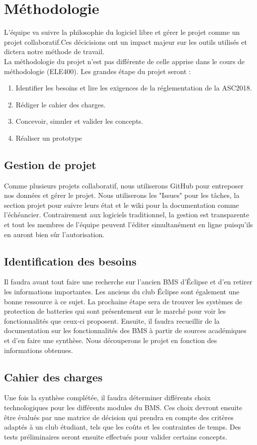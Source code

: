 \section{Méthodologie}
L'équipe va suivre la philosophie du logiciel libre et gérer le projet comme un projet collaboratif.Ces décicisions 
ont un impact majeur sur les outils utilisés et dictera notre méthode de travail. \\
La méthodologie du projet n'est pas différente de celle apprise dans le cours de méthodologie (ELE400). Les grandes étape du projet seront : 
\begin{enumerate}
	\item Identifier les besoins et lire les exigences de la réglementation de la ASC2018.
	\item Rédiger le cahier des charges.
	\item Concevoir, simuler et valider les concepts.
	\item Réaliser un prototype
\end{enumerate}

\subsection{Gestion de projet}
Comme plusieurs projets collaboratif, nous utiliserons GitHub pour entreposer nos données et gérer le projet. Nous utiliserons les "Issues" pour les tâches, la section projet pour suivre leurs état et le wiki pour la documentation comme l'échéancier. Contrairement aux logiciels traditionnel, la gestion est transparente et tout les membres de l'équipe peuvent l'éditer simultanément en ligne puisqu'ils en auront bien sûr l'autorisation. 

\subsection{Identification des besoins}
Il faudra avant tout faire une recherche sur l’ancien BMS d’Éclipse et d’en retirer les informations importantes. Les anciens du club Éclipse sont également une bonne ressource à ce sujet. La prochaine étape sera de trouver les systèmes de protection de batteries qui sont présentement sur le marché pour voir les fonctionnalités que ceux-ci proposent. Ensuite, il faudra recueillir de la documentation sur les fonctionnalités des BMS à partir de sources académiques et d’en faire une synthèse. Nous découperons le projet en fonction des informations obtenues. 

\subsection{Cahier des charges}
Une fois la synthèse complétée, il faudra déterminer différents choix technologiques pour les différents modules du BMS. Ces choix devront ensuite être évalués par une matrice de décision qui prendra en compte des critères adaptés à un club étudiant, tels que les coûts et les contraintes de temps. Des tests préliminaires seront ensuite effectués pour valider certains concepts.

